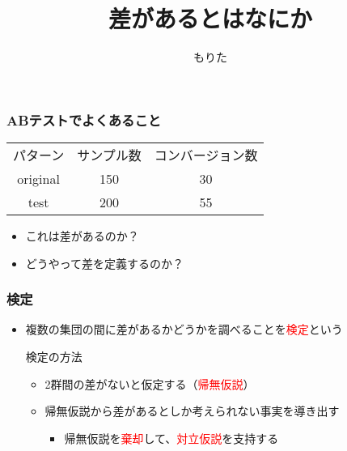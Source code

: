 \documentclass[aspectratio=169]{beamer}
\title{差があるとはなにか}
\author{もりた}
\begin{document}
    \begin{frame}
        \titlepage
    \end{frame}

    \begin{frame}
        \frametitle{ABテストでよくあること}
        \begin{center}
        \begin{tabular}{ccc}
            \hline
            パターン & サンプル数 & コンバージョン数 \\
            original & 150 & 30 \\
            test & 200 & 55 \\
            \hline
        \end{tabular}
        \end{center}
        \begin{itemize}
            \item これは差があるのか？
            \item どうやって差を定義するのか？
        \end{itemize}
    \end{frame}

    \begin{frame}
        \frametitle{検定}
        \begin{itemize}
            \item 複数の集団の間に差があるかどうかを調べることを\textcolor{red}{検定}という
            \begin{block}{検定の方法}
                \begin{itemize}
                    \item 2群間の差がないと仮定する（\textcolor{red}{帰無仮説}）
                    \item 帰無仮説から差があるとしか考えられない事実を導き出す
                    \begin{itemize}
                        \item 帰無仮説を\textcolor{red}{棄却}して、\textcolor{red}{対立仮説}を支持する
                    \end{itemize}
                \end{itemize}
            \end{block}
        \end{itemize}
    \end{frame}
\end{document}

